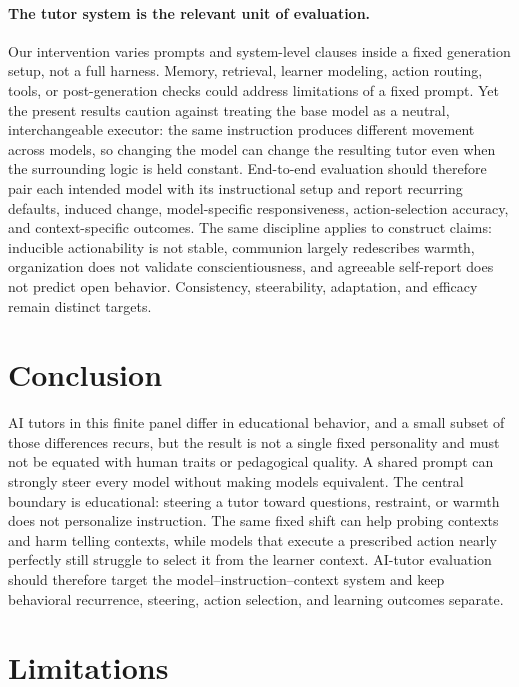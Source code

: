 \documentclass[11pt]{article}
\begin{document}
\paragraph{The tutor system is the relevant unit of evaluation.}
Our intervention varies prompts and system-level clauses inside a fixed
generation setup, not a full harness. Memory, retrieval, learner modeling,
action routing, tools, or post-generation checks could address limitations of a
fixed prompt. Yet the present results caution against treating the base model as
a neutral, interchangeable executor: the same instruction produces different
movement across models, so changing the model can change the resulting tutor
even when the surrounding logic is held constant. End-to-end evaluation should
therefore pair each intended model with its instructional setup and report
recurring defaults, induced change, model-specific responsiveness,
action-selection accuracy, and context-specific outcomes. The same discipline
applies to construct claims: inducible actionability is not stable, communion
largely redescribes warmth, organization does not validate conscientiousness,
and agreeable self-report does not predict open behavior. Consistency,
steerability, adaptation, and efficacy remain distinct targets.

\section{Conclusion}

AI tutors in this finite panel differ in educational behavior, and a small subset
of those differences recurs, but the result is not a single fixed personality
and must not be equated with human traits or pedagogical quality. A shared prompt can strongly steer every model
without making models equivalent. The central boundary is educational: steering
a tutor toward questions, restraint, or warmth does not personalize instruction.
The same fixed shift can help probing contexts and harm telling contexts, while
models that execute a prescribed action nearly perfectly still struggle to
select it from the learner context. AI-tutor evaluation should therefore target
the model--instruction--context system and keep behavioral recurrence, steering,
action selection, and learning outcomes separate.

\section*{Limitations}
\end{document}
